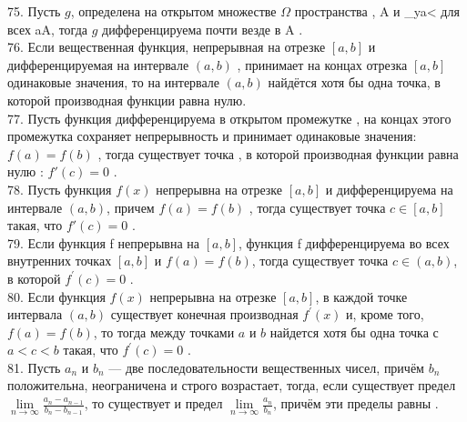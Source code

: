 \documentclass[12pt]{article}
\begin{document}
{{75. Пусть ${\displaystyle g}$, определена на открытом множестве ${\displaystyle \Omega }$ пространства {, {\displaystyle A\subset \Omega } и {\displaystyle \varlimsup _{y\to a}{}<\infty } для всех {\displaystyle a\in A}, тогда ${\displaystyle g}$ дифференцируема почти везде в {\displaystyle A} .\\

76. Если вещественная функция, непрерывная на отрезке ${\displaystyle [a,b]}$ и дифференцируемая на интервале ${\displaystyle (a,b)}$ , принимает на концах отрезка ${\displaystyle [a,b]}$ одинаковые значения, то на интервале ${\displaystyle (a,b)}$ найдётся хотя бы одна точка, в которой производная функции равна нулю.\\

77. Пусть функция  дифференцируема в открытом промежутке , на концах этого промежутка сохраняет непрерывность и принимает одинаковые значения: ${\displaystyle f(a)=f(b)}$ , тогда существует точка  , в которой производная функции  равна нулю : ${\displaystyle f'(c)=0}$  .\\

78. Пусть функция ${\displaystyle f(x)}$ непрерывна на отрезке ${\displaystyle [a,b]}$ и дифференцируема на интервале ${\displaystyle (a,b)}$, причем ${\displaystyle f(a)=f(b)}$ , тогда существует точка ${\displaystyle c \in [a, b]}$ такая, что ${\displaystyle f'(c)=0}$ .\\

79. Если функция f непрерывна на ${\displaystyle [a,b]}$, функция f дифференцируема во всех внутренних точках ${\displaystyle [a,b]}$ и ${\displaystyle f(a)=f(b)}$, тогда существует точка ${\displaystyle c\in (a,b)}$, в которой ${\displaystyle f^{\prime}(c)=0}$ .\\

80. Если функция ${\displaystyle f(x)}$  непрерывна на отрезке ${\displaystyle [a,b]}$, в каждой точке интервала ${\displaystyle (a,b)}$ существует конечная производная ${\displaystyle f^{\prime}(x)}$ и, кроме того,${\displaystyle f(a)=f(b)}$, то тогда между точками ${\displaystyle a}$ и ${\displaystyle b}$ найдется хотя бы одна точка ${\displaystyle с}$ ${\displaystyle a<c<b}$ такая, что ${\displaystyle f^{\prime}(c)=0}$ .\\

81. Пусть ${\displaystyle a_{n}}$ и ${\displaystyle b_{n}}$  — две последовательности вещественных чисел, причём ${\displaystyle b_{n}}$ положительна, неограничена и строго возрастает, тогда, если существует предел ${\displaystyle \lim \limits _{n\to \infty }{\frac {a_{n}-a_{n-1}}{b_{n}-b_{n-1}}}}$, то существует и предел ${\displaystyle \lim \limits _{n\to \infty }{\frac {a_{n}}{b_{n}}}}$, причём эти пределы равны .\\

}}}
\end{document}
